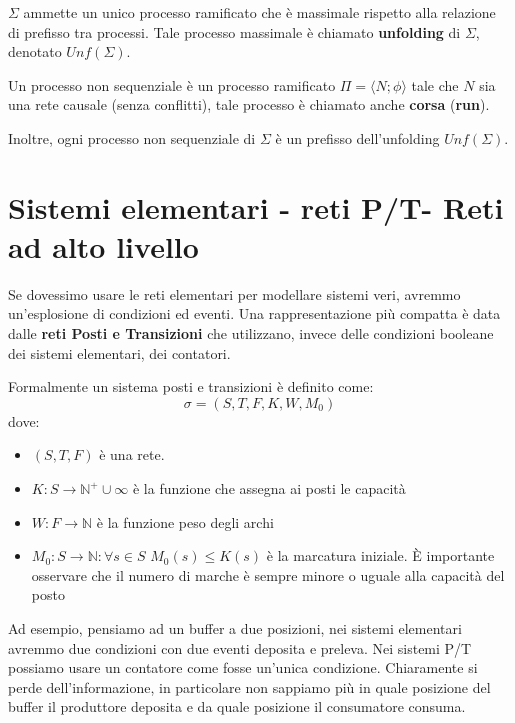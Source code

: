 \begin{definizione}
    $\Sigma$ ammette un unico processo ramificato che è massimale rispetto alla relazione di prefisso tra processi. Tale processo massimale è chiamato \textbf{unfolding} di $\Sigma$, denotato $Unf (\Sigma)$.
\end{definizione}
\begin{definizione}
    Un processo non sequenziale è un processo ramificato $\Pi = \langle N; \phi \rangle$ tale che $N$ sia una rete causale (senza conflitti), tale processo è chiamato anche \textbf{corsa} (\textbf{run}).
\end{definizione}
\begin{osservazione}
    Inoltre, ogni processo non sequenziale di $\Sigma$ è un prefisso dell'unfolding $Unf (\Sigma)$.
\end{osservazione}
\section{Sistemi elementari - reti P/T- Reti ad alto livello}
Se dovessimo usare le reti elementari per modellare sistemi veri, avremmo un'esplosione di condizioni ed eventi. Una rappresentazione più compatta è data dalle \textbf{reti Posti e Transizioni} che utilizzano, invece delle condizioni booleane dei sistemi elementari, dei contatori. 
\begin{definizione}
    Formalmente un sistema posti e transizioni è definito come:
    \begin{equation}
        \sigma = (S, T, F, K, W, M_0) 
    \end{equation}
    dove:
    \begin{itemize}
        \item $(S, T, F)$ è una rete.
        \item $K: S \to \mathbb{N}^+ \cup {\infty}$ è la funzione che assegna ai posti le capacità
        \item $W: F \to \mathbb{N}$ è la funzione peso degli archi
        \item $M_0: S \to \mathbb{N}: \forall s \in S$ $M_0(s) \leq K(s)$ è la marcatura iniziale. È importante osservare che il numero di marche è sempre minore o uguale alla capacità del posto 
    \end{itemize}
\end{definizione}
Ad esempio, pensiamo ad un buffer a due posizioni, nei sistemi elementari avremmo due condizioni con due eventi deposita e preleva. Nei sistemi P/T possiamo usare un contatore come fosse un'unica condizione. Chiaramente si perde dell'informazione, in particolare non sappiamo più in quale posizione del buffer il produttore deposita e da quale posizione il consumatore consuma.

